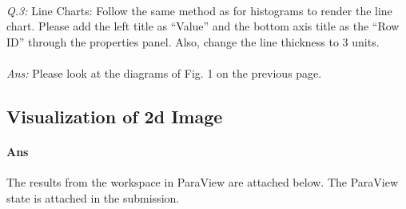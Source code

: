 \documentclass[a4paper,11pt]{article}
\theoremstyle{mytheor}
\begin{document}
\textit{\\ Q.3:} Line Charts: Follow the same method as for histograms to render the line chart. Please add the left title as “Value” and the bottom axis title as the “Row ID” through the properties panel. Also, change the line thickness to 3 units. \\ \\ 
\textit{Ans:} Please look at the diagrams of Fig. 1 on the previous page.
\clearpage

\subsection{Visualization of 2d Image}
\paragraph{Ans} The results from the workspace in ParaView are attached below. The ParaView state is attached in the submission. 
\end{document}

